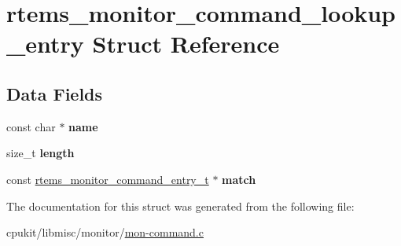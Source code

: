 \hypertarget{structrtems__monitor__command__lookup__entry}{}\section{rtems\+\_\+monitor\+\_\+command\+\_\+lookup\+\_\+entry Struct Reference}
\label{structrtems__monitor__command__lookup__entry}
\subsection*{Data Fields}
\begin{DoxyCompactItemize}
\item 
\mbox{\label{structrtems__monitor__command__lookup__entry_ac1306d368a7871c2e1c5cc871b6f1dd1}} 
const char $\ast$ {\bfseries name}
\item 
\mbox{\label{structrtems__monitor__command__lookup__entry_ae21370805cf02f0704eb60a084a7a396}} 
size\+\_\+t {\bfseries length}
\item 
\mbox{\label{structrtems__monitor__command__lookup__entry_a3a719fed6ef594a972d672595385d29c}} 
const \mbox{\hyperlink{structrtems__monitor__command__entry__s}{rtems\+\_\+monitor\+\_\+command\+\_\+entry\+\_\+t}} $\ast$ {\bfseries match}
\end{DoxyCompactItemize}


The documentation for this struct was generated from the following file\+:\begin{DoxyCompactItemize}
\item 
cpukit/libmisc/monitor/\mbox{\hyperlink{mon-command_8c}{mon-\/command.\+c}}\end{DoxyCompactItemize}
